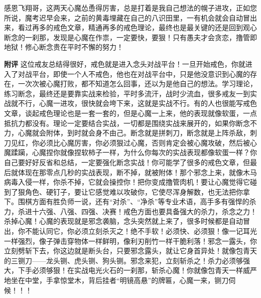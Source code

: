\begin{case}
    感恩飞翔哥，这两天心魔怂恿得厉害，总是打着是我自己想法的幌子进攻，正如您所说，魔考迟早会来，之前的黄毒埋藏在自己的八识田里，一有机会就会自动冒出来，看过再多的戒色文章，精通再多的戒色理论，最终也是最关键的还是回到观心断念的一刹那，发现是心魔在作祟，一定要快，要狠！只有愚夫才会贪恋，撸管即地狱！修心断念贵在平时不懈的努力！

    \textbf{附评} 这位戒友总结得很好，戒色就是进入念头对战平台！一旦开始戒色，你就进入了对战平台，即使一个人不戒色，他也在对战平台中，只是他没意识到心魔的存在，一次次被心魔打败，都不知道怎么回事，还以为是他自己的想法。学习理论，练习断念，最终还是要靠实战来检验，平时多流汗，战时少流血，很多戒友一到实战就不行，心魔一进攻，很快就会垮下来，这就是实战不行。有的人也很能写戒色文章，谈起戒色理论也是一套一套的，但是心魔一上来，他的表现就像软蛋，一点抵抗力都没有。理论一定要结合实战，一切都是围绕实战来展开的，如果你断念不力，心魔就会附体，到时就会身不由己。断念就是拼刺刀，断念就是上阵杀敌，刺刀见红，你必须比心魔厉害，你必须狠过心魔，否则肯定会被心魔攻破，然后被心魔蹂躏，心魔捏你就像捏软柿子一样，为什么你每次的实战表现都像软蛋一样？你自己要好好反省和总结，一定要强化断念实战！你可能学了很多的戒色文章，但最后就体现在那零点几秒的实战表现，断不掉，就被附体！那个邪念上来，就像木马病毒入侵一样，你杀不掉，它就会操控你！把你变成撸管肉机！要让心魔觉得它碰到了狠角色、硬钉子，要让它感觉难以攻破你，它使尽浑身解数，也无法把你拿下。围棋方面有胜负师一说，还有“对杀”、“净杀”等专业术语，高手多有强悍的杀力，杀进十六强、八强、四强、决赛！戒色方面也要具备强大的杀力，杀念之力！杀掉心魔！心魔的表现就是邪念袭脑，念头突然就上来了，很多时候都是自动冒出，你不能认同它，你必须立刻杀灭之！绝不手软！必须快、必须狠！像一记耳光一样强烈，像子弹击穿物体一样鲜明，像利刃削竹一样干脆利落！邪念一露头，你立刻劈斩下去，你这边就是断头台，只要邪念露头，就让它身首异处！就像包青天的三铡刀——龙头铡、虎头铡、狗头铡。邪念来犯，立刻斩杀之！杀力必须够强大，下手必须够狠！在实战电光火石的一刹那，斩杀心魔！你就像包青天一样威严地坐在中堂，手拿惊堂木，背后挂者“明镜高悬”的牌匾，心魔一来，铡刀伺候！！！
\end{case}

